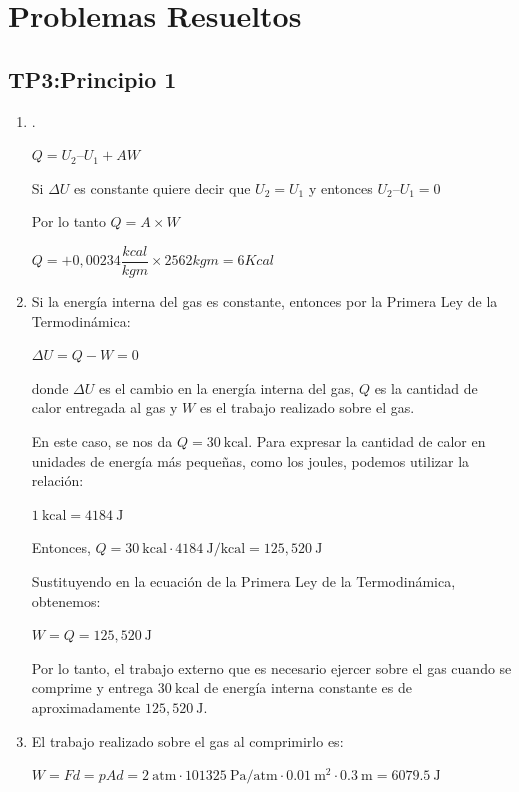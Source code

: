 \documentclass[../main]{subfiles}
\begin{document}
\chapter*{Problemas Resueltos}
\section{TP3:Principio 1}
\begin{enumerate}
 \item .

 
 $Q = U_2 – U_1 + A W$
 
Si $\Delta U$ es constante quiere decir que $U_2 = U_1$ y entonces $U_2 – U_1 = 0$

Por lo tanto $Q = A \times W$

 $Q = + 0,00234\dfrac{kcal}{kgm} \times 2562 kgm = 6 Kcal$

\item Si la energía interna del gas es constante, entonces por la Primera Ley de la Termodinámica:

$\Delta U = Q - W = 0$

donde $\Delta U$ es el cambio en la energía interna del gas, $Q$ es la cantidad de calor entregada al gas y $W$ es el trabajo realizado sobre el gas.

En este caso, se nos da $Q = 30\ \text{kcal}$. Para expresar la cantidad de calor en unidades de energía más pequeñas, como los joules, podemos utilizar la relación:

$1\ \text{kcal} = 4184\ \text{J}$

Entonces, $Q = 30\ \text{kcal} \cdot 4184\ \text{J/kcal} = 125,520\ \text{J}$

Sustituyendo en la ecuación de la Primera Ley de la Termodinámica, obtenemos:

$W = Q = 125,520\ \text{J}$

Por lo tanto, el trabajo externo que es necesario ejercer sobre el gas cuando se comprime y entrega $30\ \text{kcal}$ de energía interna constante es de aproximadamente $125,520\ \text{J}$.
 \item El trabajo realizado sobre el gas al comprimirlo es:

$W = Fd = pA d = 2\ \text{atm} \cdot 101325\ \text{Pa/atm} \cdot 0.01\ \text{m}^2 \cdot 0.3\ \text{m} = 6079.5\ \text{J}$


\end{enumerate}
\end{document}
